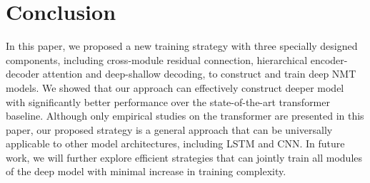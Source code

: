 \documentclass[11pt,a4paper]{article}
\begin{document}
\section{Conclusion}
In this paper, we proposed a new training strategy with three specially designed components, including cross-module residual connection, hierarchical encoder-decoder attention and deep-shallow decoding, to construct and train deep NMT models. We showed that our approach can effectively construct deeper model with significantly better performance over the state-of-the-art transformer baseline. Although only empirical studies on the transformer are presented in this paper, our proposed strategy is a general approach that can be universally applicable to other model architectures, including LSTM and CNN. In future work, we will further explore efficient strategies that can jointly train all modules of the deep model with minimal increase in training complexity.



\end{document}
